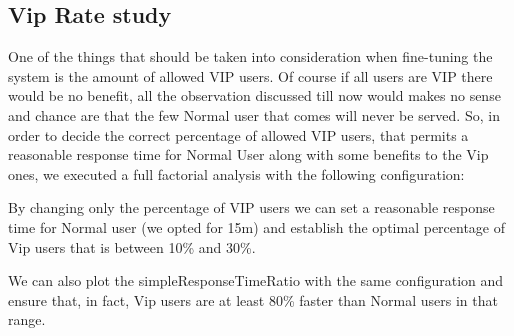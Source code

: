 
\subsection{Vip Rate study}

One of the things that should be taken into consideration when fine-tuning the system is the amount of allowed VIP users. Of course if all users are VIP there would be no benefit, all the observation discussed till now would makes no sense and chance are that the few Normal user that comes will never be served. So, in order to decide the correct percentage of allowed VIP users, that permits a reasonable response time for Normal User along with some benefits to the Vip ones, we executed a full factorial analysis with the following configuration:
 

 By changing only the percentage of VIP users we can set a reasonable response time for Normal user (we opted for 15m) and establish the optimal percentage of Vip users that is between 10\% and 30\%.


 We can also plot the simpleResponseTimeRatio with the same configuration and ensure that, in fact, Vip users are at least 80\% faster than Normal users in that range.

